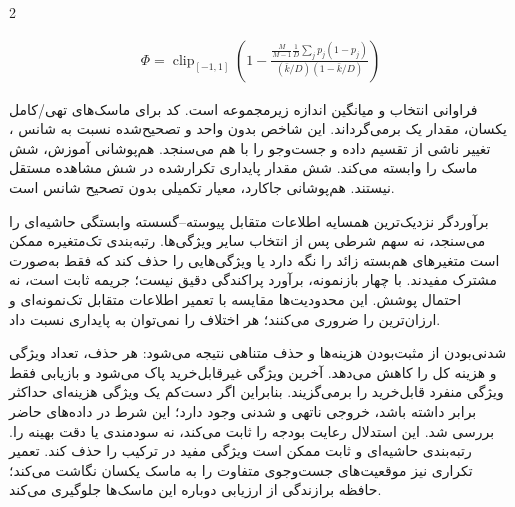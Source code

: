 \documentclass[10pt,a4paper]{article}
\begin{document}
\begin{multicols}{2}
\begin{latin}\begin{equation}\begin{gathered}\Phi=\operatorname{clip}_{[-1,1]}\left(1-\frac{\frac{M}{M-1}\frac{1}{D}\sum_j p_j(1-p_j)}{(\bar k/D)(1-\bar k/D)}\right)\end{gathered}\end{equation}\end{latin}
 فراوانی انتخاب و  میانگین اندازه زیرمجموعه است. کد برای ماسک‌های تهی/کامل یکسان، مقدار یک برمی‌گرداند. این شاخص بدون واحد و تصحیح‌شده نسبت به شانس \lr{[2]}، تغییر ناشی از تقسیم داده و جست‌وجو را با هم می‌سنجد. هم‌پوشانی آموزش، شش ماسک را وابسته می‌کند. شش مقدار پایداری تکرارشده در  شش مشاهده مستقل نیستند. هم‌پوشانی جاکارد، معیار تکمیلی بدون تصحیح شانس است.

برآوردگر نزدیک‌ترین همسایه اطلاعات متقابل پیوسته–گسسته \lr{[11]} وابستگی حاشیه‌ای را می‌سنجد، نه سهم شرطی پس از انتخاب سایر ویژگی‌ها. رتبه‌بندی تک‌متغیره ممکن است متغیرهای هم‌بسته زائد را نگه دارد یا ویژگی‌هایی را حذف کند که فقط به‌صورت مشترک مفیدند. با چهار بازنمونه، برآورد پراکندگی دقیق نیست؛  جریمه ثابت است، نه احتمال پوشش. این محدودیت‌ها مقایسه با تعمیر اطلاعات متقابل تک‌نمونه‌ای و ارزان‌ترین را ضروری می‌کنند؛ هر اختلاف را نمی‌توان به پایداری نسبت داد.

شدنی‌بودن از مثبت‌بودن هزینه‌ها و حذف متناهی نتیجه می‌شود: هر حذف، تعداد ویژگی و هزینه کل را کاهش می‌دهد. آخرین ویژگی غیرقابل‌خرید پاک می‌شود و بازیابی فقط ویژگی منفرد قابل‌خرید را برمی‌گزیند. بنابراین اگر دست‌کم یک ویژگی هزینه‌ای حداکثر برابر  داشته باشد، خروجی ناتهی و شدنی وجود دارد؛ این شرط در داده‌های حاضر بررسی شد. این استدلال رعایت بودجه را ثابت می‌کند، نه سودمندی یا دقت بهینه را. رتبه‌بندی حاشیه‌ای و ثابت ممکن است ویژگی مفید در ترکیب را حذف کند. تعمیر تکراری نیز موقعیت‌های جست‌وجوی متفاوت را به ماسک یکسان نگاشت می‌کند؛ حافظه برازندگی از ارزیابی دوباره این ماسک‌ها جلوگیری می‌کند.


\end{multicols}
\end{document}
